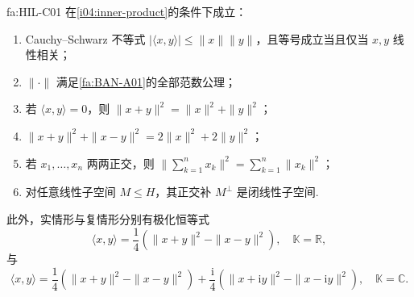 \begin{FAProposition}[C][Hilbert正交计算工具]{fa:HIL-C01}
在\autoref{i04:inner-product}的条件下成立：
\begin{enumerate}[label=\textnormal{(\roman*)}]
\item Cauchy--Schwarz 不等式 \(\displaystyle |\langle x,y\rangle|\leqslant\|x\|\|y\|\)，且等号成立当且仅当 \(\displaystyle x,y\) 线性相关；
\item \(\displaystyle \|\cdot\|\) 满足\autoref{fa:BAN-A01}的全部范数公理；
\item 若 \(\displaystyle \langle x,y\rangle=0\)，则 \(\displaystyle \|x+y\|^2=\|x\|^2+\|y\|^2\)；
\item \(\displaystyle \|x+y\|^2+\|x-y\|^2=2\|x\|^2+2\|y\|^2\)；
\item 若 \(\displaystyle x_1,\dots,x_n\) 两两正交，则 \(\displaystyle \|\sum_{k=1}^n x_k\|^2=\sum_{k=1}^n\|x_k\|^2\)；
\item 对任意线性子空间 \(\displaystyle M\leqslant H\)，其正交补 \(\displaystyle M^\perp\) 是闭线性子空间.
\end{enumerate}
此外，实情形与复情形分别有极化恒等式
\[
\langle x,y\rangle
=\frac14\left(\|x+y\|^2-\|x-y\|^2\right),
\quad \mathbb K=\mathbb R,
\]
与
\[
\langle x,y\rangle
=\frac14\left(\|x+y\|^2-\|x-y\|^2\right)
+\frac{\mathrm{i}}4\left(\|x+\mathrm{i}y\|^2-\|x-\mathrm{i}y\|^2\right),
\quad \mathbb K=\mathbb C.
\]
\end{FAProposition}

